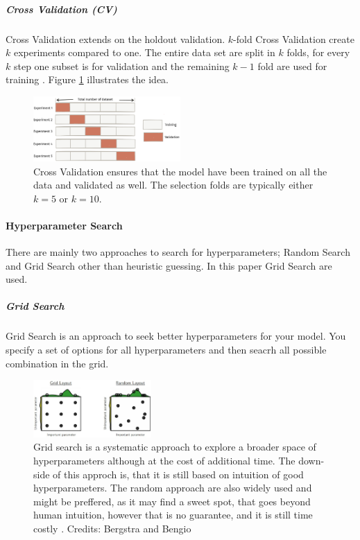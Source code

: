 \subparagraph{Cross Validation (CV)}

Cross Validation extends on the holdout validation. $k$-fold Cross Validation create $k$ experiments compared to one. The entire data set are split in $k$ folds, for every $k$ step one subset is for validation and the remaining $k-1$ fold are used for training \cite{Goodfellow-et-al-2016}. Figure \ref{fig:cv} illustrates the idea. 

\begin{figure}[H]
    \centering
    \includegraphics[width=0.5\textwidth]{figures/cv.png}
    \caption[]{Cross Validation ensures that the model have been trained on all the data and validated as well. The selection folds are typically either $k=5$ or $k=10$. }
    \label{fig:cv}
\end{figure}

\paragraph{Hyperparameter Search}

There are mainly two approaches to search for hyperparameters; Random Search and Grid Search other than heuristic guessing. In this paper Grid Search are used.

\subparagraph{Grid Search}

Grid Search is an approach to seek better hyperparameters for your model. You specify a set of options for all hyperparameters and then seacrh all possible combination in the grid. 

\begin{figure}[H]
    \centering
    \includegraphics[width=0.4\textwidth]{figures/gridsearch_vs_randomsearch.jpeg}
    \caption[]{Grid search is a systematic approach to explore a broader space of hyperparameters although at the cost of additional time. The down-side of this approch is, that it is still based on intuition of good hyperparameters. The random approach are also widely used and might be preffered, as it may find a sweet spot, that goes beyond human intuition, however that is no guarantee, and it is still time costly \cite{Bergstra}. Credits: Bergstra and Bengio}
    \label{fig:gs_vs_rs}
\end{figure}

  